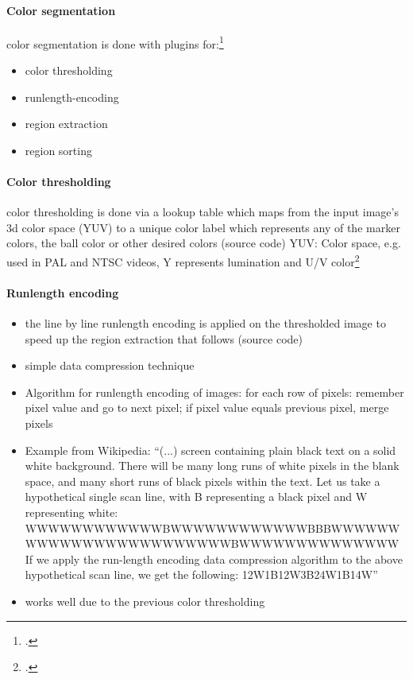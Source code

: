 \paragraph{Color segmentation}
color segmentation is done with plugins for:\footcite[Cf.][]{zickler_ssl_vision}
\begin{itemize}
  \item color thresholding
  \item runlength-encoding 
  \item region extraction
  \item region sorting
\end{itemize}

\paragraph{Color thresholding}
color thresholding is done via a lookup table which maps from the input image’s
3d color space (YUV) to a unique color label which represents any of the marker
colors, the ball color or other desired colors (source code) YUV: Color space,
e.g. used in PAL and NTSC videos, Y represents lumination and U/V color\footcite[Cf.][]{zickler_ssl_vision}

\paragraph{Runlength encoding}

\begin{itemize}
  \item the line by line runlength encoding is applied on the thresholded image to speed up the region extraction that follows (source code)
  \item simple data compression technique
  \item Algorithm for runlength encoding of images:
for each row of pixels:
remember pixel value and go to next pixel;
if pixel value equals previous pixel, merge pixels
  \item Example from Wikipedia:
“(...) screen containing plain black text on a solid white background. There will be many long runs of white pixels in the blank space, and many short runs of black pixels within the text. Let us take a hypothetical single scan line, with B representing a black pixel and W representing white:
WWWWWWWWWWWWBWWWWWWWWWWWWBBBWWWWWWWWWWWWWWWWWWWWWWWWBWWWWWWWWWWWWWW
If we apply the run-length encoding data compression algorithm to the above hypothetical scan line, we get the following:
12W1B12W3B24W1B14W”
  \item works well due to the previous color thresholding
\end{itemize}

